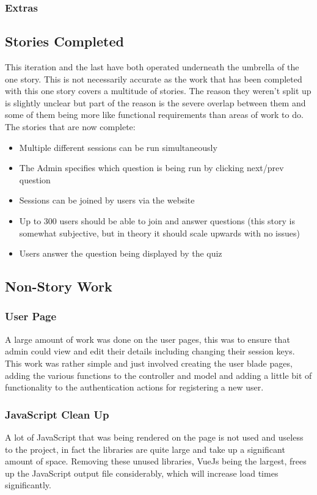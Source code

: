 \subsubsection{Extras}
\newpage

\subsection{Stories Completed}
This iteration and the last have both operated underneath the umbrella of the one story. This is not necessarily accurate as the work that has been completed with this one story covers a multitude of stories. The reason they weren't split up is slightly unclear but part of the reason is the severe overlap between them and some of them being more like functional requirements than areas of work to do. The stories that are now complete:
\begin{itemize}
	\item Multiple different sessions can be run simultaneously
	\item The Admin specifies which question is being run by clicking next/prev question
	\item Sessions can be joined by users via the website
	\item Up to 300 users should be able to join and answer questions (this story is somewhat subjective, but in theory it should scale upwards with no issues)
	\item Users answer the question being displayed by the quiz
\end{itemize}
\newpage

\subsection{Non-Story Work}
\subsubsection{User Page}
A large amount of work was done on the user pages, this was to ensure that admin could view and edit their details including changing their session keys. This work was rather simple and just involved creating the user blade pages, adding the various functions to the controller and model and adding a little bit of functionality to the authentication actions for registering a new user.
\subsubsection{JavaScript Clean Up}
A lot of JavaScript that was being rendered on the page is not used and useless to the project, in fact the libraries are quite large and take up a significant amount of space. Removing these unused libraries, VueJs being the largest, frees up the JavaScript output file considerably, which will increase load times significantly.
\newpage
